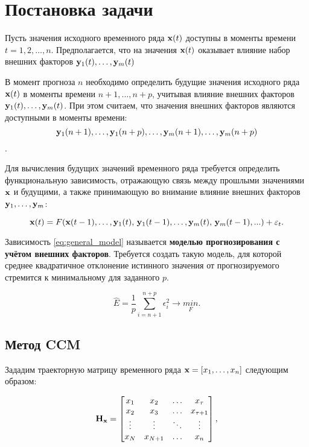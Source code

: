 \documentclass[a4paper, 12pt]{article}
\begin{document}
\section{Постановка задачи}
Пусть значения исходного временного ряда $\mathbf{x}(t)$ доступны в  моменты времени $t = 1, 2, \ldots, n$. Предполагается, что на значения $\mathbf{x}(t)$ оказывает влияние набор внешних факторов $\mathbf{y}_1(t), \ldots, \mathbf{y}_m(t)$

В момент прогноза $n$ необходимо определить будущие значения исходного ряда $\mathbf{x}(t)$ в моменты времени $n+1, \ldots, n+p$, учитывая влияние внешних факторов $\mathbf{y}_1(t), \ldots, \mathbf{y}_m(t)$. При этом считаем, что значения внешних факторов являются доступными в моменты времени: \[\mathbf{y}_1(n+1), \ldots, \mathbf{y}_1(n+p), \ldots, \mathbf{y}_m(n+1), \ldots, \mathbf{y}_m(n+p)\].

Для вычисления будущих значений временного ряда требуется определить функциональную зависимость, отражающую связь между прошлыми значениями $\mathbf{x}$ и будущими, а также принимающую во внимание влияние внешних факторов $\mathbf{y}_1, \ldots, \mathbf{y}_m$:

\begin{equation} \label{eq:general_model}
	\mathbf{x}(t) = F(\mathbf{x}(t-1), \ldots, \mathbf{y}_1(t), \, \mathbf{y}_1(t-1), \ldots, \mathbf{y}_m(t), \, \mathbf{y}_m(t-1), ...) + \varepsilon_t.
\end{equation}

Зависимость \eqref{eq:general_model} называется \textbf{моделью прогнозирования с учётом внешних факторов}.
Требуется создать такую модель, для которой среднее квадратичное отклонение истинного значения от прогнозируемого стремится к минимальному для заданного $p$. 

\begin{equation} \label{eq:model_error}
	\hat{E} = \dfrac{1}{p} \sum\limits_{i=n+1}^{n+p} \epsilon_i^2 \rightarrow \underset{F}{min}.
\end{equation}

\subsection{Метод CCM}
Зададим траекторную матрицу временного ряда $\mathbf{x} = [x_1, \ldots, x_n]$ следующим образом: 

\begin{equation*} \label{eq:traj_mat}
	\mathbf{H}_{\mathbf{x}} = \begin{bmatrix}
		x_1 & x_2 & \ldots & x_{\tau} \\
		x_2 & x_3 & \ldots & x_{\tau+1} \\
		\vdots & \vdots & \ddots & \vdots \\
		x_{N} & x_{N+1} & \ldots & x_n
	\end{bmatrix}, 
\end{equation*} 
\end{document}
